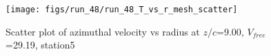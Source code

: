 \begin{figure}[H]
\centering
\texttt{[image: figs/run\_48/run\_48\_T\_vs\_r\_mesh\_scatter]}
\caption{Scatter plot of azimuthal velocity vs radius at $z/c$=9.00, $V_{free}$=29.19, station5}
\label{fig:run_48_T_vs_r_mesh_scatter}
\end{figure}


